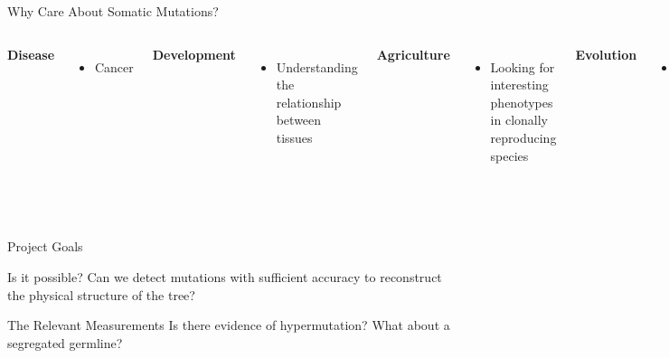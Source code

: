 \documentclass{beamer}
\begin{document}
\begin{frame}{Why Care About Somatic Mutations?}
\begin{columns}

\textbf{Disease}
\begin{itemize}
\item Cancer
\end{itemize}

\vfill

\textbf{Development}
\begin{itemize}
\item Understanding the relationship between tissues
\end{itemize}

\vfill

\textbf{Agriculture}
\begin{itemize}
\item Looking for interesting phenotypes in clonally reproducing species
\end{itemize}

\textbf{Evolution}
\begin{itemize}
\item Determining the relationship between somatic and germline mutation rate
\end{itemize}

\includegraphics[width=\linewidth]{nectarine.jpg}

\end{columns}
\end{frame}

\begin{frame}{Project Goals}

\begin{block}{Is it possible?}
Can we detect mutations with sufficient accuracy to reconstruct the physical structure of the tree?
\end{block}

\begin{exampleblock}{The Relevant Measurements}
Is there evidence of hypermutation? What about a segregated germline?
\end{exampleblock}

\end{frame}
\end{document}

